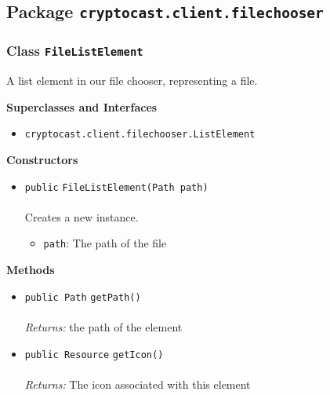 \subsection{Package \lstinline!cryptocast.client.filechooser!}

\subsubsection{Class \lstinline|FileListElement|}
A list element in our file chooser, representing a file. \\
\noindent\begin{minipage}[t]{5cm}
\vspace{0.3em}
\hspace*{2em}
\vspace{0.3em}
\end{minipage}



\textbf{\sffamily Superclasses and Interfaces}
\begin{itemize}
\item \lstinline|cryptocast.client.filechooser.ListElement|
\end{itemize}


\textbf{\sffamily Constructors}
\begin{itemize}
\item \lstinline|public| \lstinline|FileListElement|\lstinline|(Path path)|\\ \\[-0.6em]
Creates a new instance.
\begin{itemize}
\item \lstinline|path|: The path of the file
\end{itemize}



\end{itemize}


\textbf{\sffamily Methods}
\begin{itemize}
\item \lstinline|public Path| \lstinline|getPath|\lstinline|()|\\ \\[-0.6em]
\emph{Returns:} the path of the element



\item \lstinline|public Resource| \lstinline|getIcon|\lstinline|()|\\ \\[-0.6em]
\emph{Returns:} The icon associated with this element



\end{itemize}

